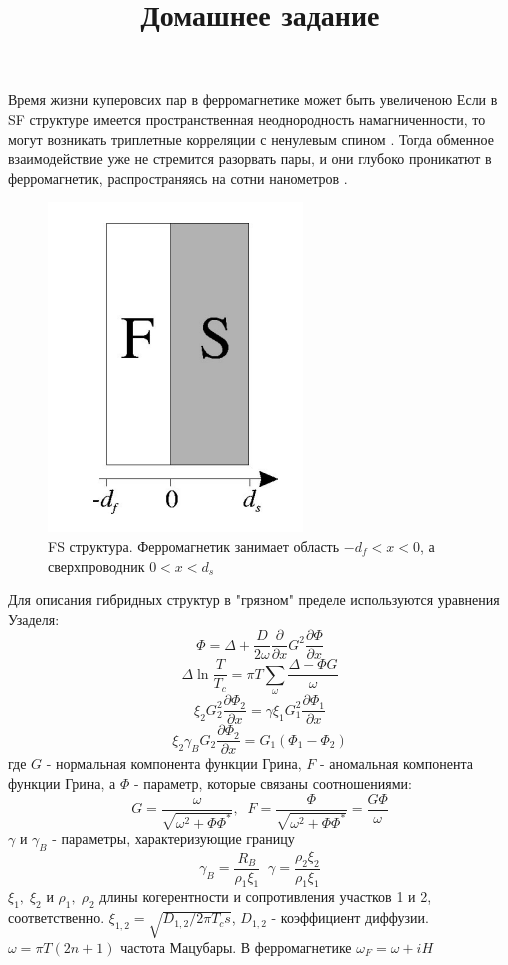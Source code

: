 \documentclass{article}
\title{Домашнее задание}
\date{}
\begin{document}
\maketitle

Время жизни куперовсих пар в ферромагнетике может быть увеличеною Если в SF структуре имеется пространственная неоднородность намагниченности, то могут возникать триплетные корреляции с ненулевым спином \cite{bergeret2001long, kadigrobov2001quantum}. Тогда обменное взаимодействие уже не стремится разорвать пары, и они глубоко проникатют в ферромагнетик, распространяясь на сотни нанометров \cite{keizer2006spin}. 
\begin{figure}[h]
    \centering
    \includegraphics{FS.png}
    \caption{FS структура. Ферромагнетик занимает область $-d_f<x<0$, а сверхпроводник $0<x<d_s$}
    \label{FS}
\end{figure}

Для описания гибридных структур в "грязном" пределе используются уравнения Узаделя:
\[\Phi = \Delta + \frac{D}{2\omega}\frac{\partial}{\partial x}G^2\frac{\partial \Phi}{\partial x}\]
\[\Delta \ln \frac{T}{T_c} = \pi T \sum\limits_\omega \frac{\Delta - \Phi G}{\omega}\]
\[\xi_2 G_2^2 \frac{\partial \Phi_2}{\partial x} = \gamma\xi_1 G_1^2 \frac{\partial \Phi_1}{\partial x}\]
\[\xi_2 \gamma_B G_2 \frac{\partial \Phi_2}{\partial x} = G_1(\Phi_1 - \Phi_2)\]
где $G$ - нормальная компонента функции Грина, $F$ - аномальная компонента функции Грина, а $\Phi$ - параметр, которые связаны соотношениями:
\[G = \frac{\omega}{\sqrt{\omega^2 + \Phi\Phi^*}}, \; \; F = \frac{\Phi}{\sqrt{\omega^2 + \Phi\Phi^*}} = \frac{G\Phi}{\omega}\]
$\gamma$ и $\gamma_B$ - параметры, характеризующие границу 
\[\gamma_B = \frac{R_B}{\rho_1 \xi_1} \; \; \gamma = \frac{\rho_2\xi_2}{\rho_1\xi_1}\]
$\xi_1, \; \xi_2$ и $\rho_1, \; \rho_2$ длины когерентности и сопротивления участков 1 и 2, соответственно. $\xi_{1,2} = \sqrt{D_{1,2}/2\pi T_cs}$, $D_{1,2}$ - коэффициент диффузии.
\newline $\omega = \pi T (2n+1)$ частота Мацубары. В ферромагнетике $\omega_F = \omega + iH$
\end{document}
